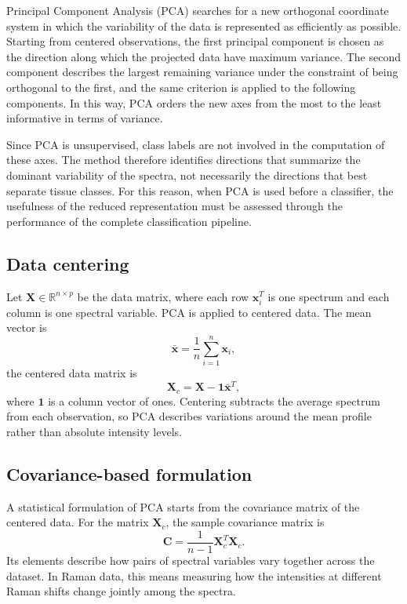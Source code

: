 Principal Component Analysis (PCA) searches for a new orthogonal coordinate system in
which the variability of the data is represented as efficiently as possible. Starting from
centered observations, the first principal component is chosen as the direction along which
the projected data have maximum variance. The second component describes the largest
remaining variance under the constraint of being orthogonal to the first, and the same
criterion is applied to the following components. In this way, PCA orders the new axes from
the most to the least informative in terms of variance.

Since PCA is unsupervised, class labels are not involved in the computation of these axes.
The method therefore identifies directions that summarize the dominant variability of the
spectra, not necessarily the directions that best separate tissue classes. For this reason,
when PCA is used before a classifier, the usefulness of the reduced representation must be
assessed through the performance of the complete classification pipeline.

\subsection{Data centering}
\label{subsec:pca_centering_covariance}

Let \(\mathbf{X} \in \mathbb{R}^{n \times p}\) be the data matrix, where each row
\(\mathbf{x}_i^{T}\) is one spectrum and each column is one spectral variable. PCA is
applied to centered data. The mean vector is
\begin{equation}
    \bar{\mathbf{x}} =
    \frac{1}{n}\sum_{i=1}^{n}\mathbf{x}_i,
    \label{eq:pca_mean_spectrum}
\end{equation}
the centered data matrix is
\begin{equation}
    \mathbf{X}_c =
    \mathbf{X} - \mathbf{1}\bar{\mathbf{x}}^{T},
    \label{eq:pca_centered_matrix}
\end{equation}
where \(\mathbf{1}\) is a column vector of ones. Centering subtracts the average spectrum
from each observation, so PCA describes variations around the mean profile rather than
absolute intensity levels.

\subsection{Covariance-based formulation}
\label{subsec:pca_covariance_formulation}

A statistical formulation of PCA starts from the covariance matrix of the
centered data. For the matrix \(\mathbf{X}_c\), the sample covariance matrix is
\begin{equation}
    \mathbf{C} =
    \frac{1}{n-1}\mathbf{X}_c^{T}\mathbf{X}_c .
    \label{eq:pca_covariance_matrix}
\end{equation}
Its elements describe how pairs of spectral variables vary together across the dataset.
In Raman data, this means measuring how the intensities at different Raman shifts change
jointly among the spectra.

